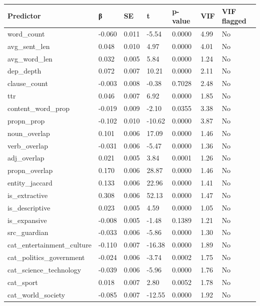 \begin{tabular}{lllllll}
\toprule
Predictor & β & SE & t & p-value & VIF & VIF flagged \\
\midrule
word\_count & -0.060 & 0.011 & -5.54 & 0.0000 & 4.99 & No \\
avg\_sent\_len & 0.048 & 0.010 & 4.97 & 0.0000 & 4.01 & No \\
avg\_word\_len & 0.032 & 0.005 & 5.84 & 0.0000 & 1.24 & No \\
dep\_depth & 0.072 & 0.007 & 10.21 & 0.0000 & 2.11 & No \\
clause\_count & -0.003 & 0.008 & -0.38 & 0.7028 & 2.48 & No \\
ttr & 0.046 & 0.007 & 6.92 & 0.0000 & 1.85 & No \\
content\_word\_prop & -0.019 & 0.009 & -2.10 & 0.0355 & 3.38 & No \\
propn\_prop & -0.102 & 0.010 & -10.62 & 0.0000 & 3.87 & No \\
noun\_overlap & 0.101 & 0.006 & 17.09 & 0.0000 & 1.46 & No \\
verb\_overlap & -0.031 & 0.006 & -5.47 & 0.0000 & 1.36 & No \\
adj\_overlap & 0.021 & 0.005 & 3.84 & 0.0001 & 1.26 & No \\
propn\_overlap & 0.170 & 0.006 & 28.87 & 0.0000 & 1.46 & No \\
entity\_jaccard & 0.133 & 0.006 & 22.96 & 0.0000 & 1.41 & No \\
is\_extractive & 0.308 & 0.006 & 52.13 & 0.0000 & 1.47 & No \\
is\_descriptive & 0.023 & 0.005 & 4.59 & 0.0000 & 1.05 & No \\
is\_expansive & -0.008 & 0.005 & -1.48 & 0.1389 & 1.21 & No \\
src\_guardian & -0.033 & 0.006 & -5.86 & 0.0000 & 1.30 & No \\
cat\_entertainment\_culture & -0.110 & 0.007 & -16.38 & 0.0000 & 1.89 & No \\
cat\_politics\_government & -0.024 & 0.006 & -3.74 & 0.0002 & 1.75 & No \\
cat\_science\_technology & -0.039 & 0.006 & -5.96 & 0.0000 & 1.76 & No \\
cat\_sport & 0.018 & 0.007 & 2.80 & 0.0052 & 1.78 & No \\
cat\_world\_society & -0.085 & 0.007 & -12.55 & 0.0000 & 1.92 & No \\
\bottomrule
\end{tabular}
